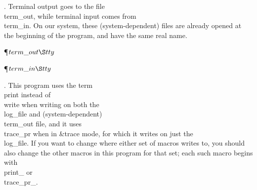 .
Terminal output goes to the file \\{term\_out}, while terminal input
comes from \\{term\_in}.  On our system, these (system-dependent) files
are already opened at the beginning of the program, and have the same
real name.

\Y\P\D {}$\\{term\_out}\S\\{tty}$\par
\P\D {}$\\{term\_in}\S\\{tty}$\par
\fi

.
This program uses the term \\{print} instead of \\{write} when writing on
both the \\{log\_file} and (system-dependent) \\{term\_out} file, and it
uses \\{trace\_pr} when in  \&{trace}  mode, for which it writes on just the
\\{log\_file}.  If you want to change where either set of macros writes
to, you should also change the other macros in this program for that
set; each such macro begins with \\{print\_} or \\{trace\_pr\_}.

